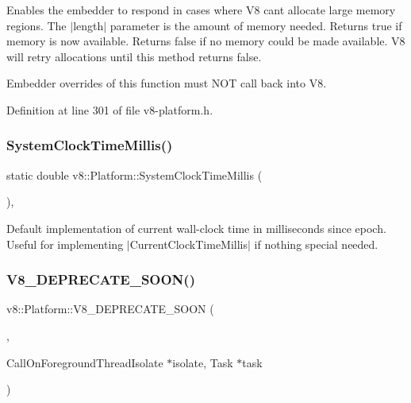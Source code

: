 Enables the embedder to respond in cases where V8 can\textquotesingle{}t allocate large memory regions. The $\vert$length$\vert$ parameter is the amount of memory needed. Returns true if memory is now available. Returns false if no memory could be made available. V8 will retry allocations until this method returns false.

Embedder overrides of this function must N\+OT call back into V8. 

Definition at line 301 of file v8-\/platform.\+h.

\mbox{\label{classv8_1_1Platform_a18ccdaf3a1a738bd4082dbbe749d026b}} 
\subsubsection{\texorpdfstring{System\+Clock\+Time\+Millis()}{SystemClockTimeMillis()}}
{\footnotesize\ttfamily static double v8\+::\+Platform\+::\+System\+Clock\+Time\+Millis (\begin{DoxyParamCaption}{ }\end{DoxyParamCaption})\hspace{0.3cm}{\ttfamily [static]}, {\ttfamily [protected]}}

Default implementation of current wall-\/clock time in milliseconds since epoch. Useful for implementing $\vert$\+Current\+Clock\+Time\+Millis$\vert$ if nothing special needed. \mbox{\label{classv8_1_1Platform_a2a25af03a35d938b37f2378d25ad4c6e}} 
\subsubsection{\texorpdfstring{V8\+\_\+\+D\+E\+P\+R\+E\+C\+A\+T\+E\+\_\+\+S\+O\+O\+N()}{V8\_DEPRECATE\_SOON()}\hspace{0.1cm}{\footnotesize\ttfamily [1/3]}}
{\footnotesize\ttfamily v8\+::\+Platform\+::\+V8\+\_\+\+D\+E\+P\+R\+E\+C\+A\+T\+E\+\_\+\+S\+O\+ON (\begin{DoxyParamCaption}\item[{\char`\"{}Use a taskrunner acquired by \mbox{\hyperlink{classv8_1_1Platform_af0d18c6bbefa133c5d11ec8a460d0278}{Get\+Foreground\+Task\+Runner}} instead.\char`\"{}}]{,  }\item[{virtual void }]{Call\+On\+Foreground\+ThreadIsolate $\ast$isolate, Task $\ast$task }\end{DoxyParamCaption})\hspace{0.3cm}{\ttfamily [pure virtual]}}

